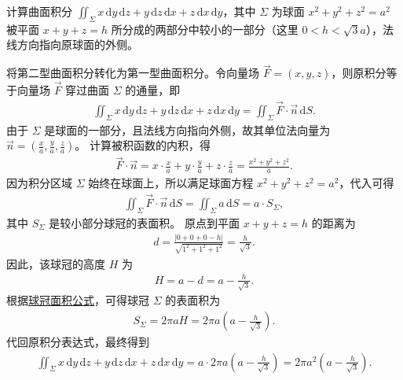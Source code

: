 \documentclass[../../main.tex]{subfiles}%
\begin{document}
\begin{example}
计算曲面积分 \(\iint_{\Sigma} x \, \mathrm{d}y \, \mathrm{d}z + y \, \mathrm{d}z \, \mathrm{d}x + z \, \mathrm{d}x \, \mathrm{d}y\)，其中 \(\Sigma\) 为球面 \(x^2 + y^2 + z^2 = a^2\) 被平面 \(x + y + z = h\) 所分成的两部分中较小的一部分（这里 \(0 < h < \sqrt{3}a\)），法线方向指向原球面的外侧。
\end{example}
\begin{solution}
将第二型曲面积分转化为第一型曲面积分。令向量场 \(\vec{F} = (x, y, z)\)，则原积分等于向量场 \(\vec{F}\) 穿过曲面 \(\Sigma\) 的通量，即
\begin{align*}
\iint_{\Sigma} x \, \mathrm{d}y \, \mathrm{d}z + y \, \mathrm{d}z \, \mathrm{d}x + z \, \mathrm{d}x \, \mathrm{d}y = \iint_{\Sigma} \vec{F} \cdot \vec{n} \, \mathrm{d}S.
\end{align*}
由于 \(\Sigma\) 是球面的一部分，且法线方向指向外侧，故其单位法向量为 \(\vec{n} = \left( \frac{x}{a}, \frac{y}{a}, \frac{z}{a} \right)\)。
计算被积函数的内积，得
\begin{align*}
\vec{F} \cdot \vec{n} = x \cdot \frac{x}{a} + y \cdot \frac{y}{a} + z \cdot \frac{z}{a} = \frac{x^2 + y^2 + z^2}{a}.
\end{align*}
因为积分区域 \(\Sigma\) 始终在球面上，所以满足球面方程 \(x^2 + y^2 + z^2 = a^2\)，代入可得
\begin{align*}
\iint_{\Sigma} \vec{F} \cdot \vec{n} \, \mathrm{d}S=\iint_{\Sigma} a \, \mathrm{d}S = a \cdot S_{\Sigma},
\end{align*}
其中 \(S_{\Sigma}\) 是较小部分球冠的表面积。
原点到平面 \(x+y+z=h\) 的距离为
\begin{align*}
d = \frac{|0+0+0-h|}{\sqrt{1^2+1^2+1^2}} = \frac{h}{\sqrt{3}}.
\end{align*}
因此，该球冠的高度 \(H\) 为
\begin{align*}
H = a - d = a - \frac{h}{\sqrt{3}}.
\end{align*}
根据\hyperref[proposition:球冠面积和体积公式]{球冠面积公式}，可得球冠 \(\Sigma\) 的表面积为
\begin{align*}
S_{\Sigma} = 2\pi a H = 2\pi a \left( a - \frac{h}{\sqrt{3}} \right).
\end{align*}
代回原积分表达式，最终得到
\begin{align*}
\iint_{\Sigma} x \, \mathrm{d}y \, \mathrm{d}z + y \, \mathrm{d}z \, \mathrm{d}x + z \, \mathrm{d}x \, \mathrm{d}y = a \cdot 2\pi a \left( a - \frac{h}{\sqrt{3}} \right) = 2\pi a^2 \left( a - \frac{h}{\sqrt{3}} \right).
\end{align*}
\end{solution}
\end{document}
